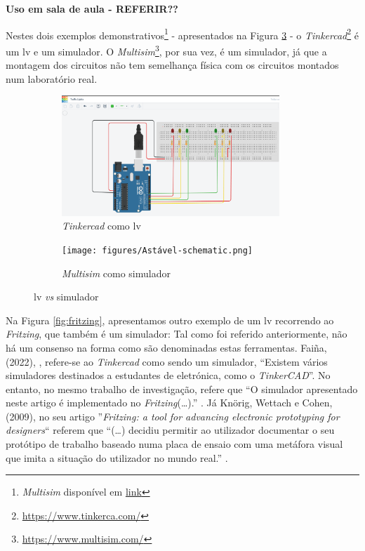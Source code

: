 \textbf{Uso em sala de aula - REFERIR??}

Nestes dois exemplos demonstrativos\footnote{\textit{Multisim} disponível em \href{https://www.ni.com/en/support/downloads/software-products/download.multisim.html\#452133}{link}} - apresentados na Figura \ref{fig:tinkercad} - o \textit{Tinkercad}\footnote{\url{https://www.tinkerca.com/}} é um \acrshort{lv} e um simulador. O \textit{Multisim}\footnote{\url{https://www.multisim.com/}}, por sua vez, é um simulador, já que a montagem dos circuitos não tem semelhança física com os circuitos montados num laboratório real.

\begin{figure}[hbtp]
    \centering
    \begin{subfigure}[hbtp]{0.48\textwidth}
        \centering
        \includegraphics[width=0.9\textwidth]{figures/tinkercad_exemplo.png}
        \caption{\textit{Tinkercad} como \acrshort{lv}}
        \label{fig:tinkercadVL}
    \end{subfigure}
    \begin{subfigure}[hbtp]{0.48\textwidth}
        \texttt{[image: figures/Astável-schematic.png]}
        \caption{\textit{Multisim} como simulador}
        \label{fig:tinkercadOS}
    \end{subfigure}
    \caption{\acrshort{lv} \textit{vs} simulador}
    \label{fig:tinkercad}
\end{figure}

Na Figura \ref{fig:fritzing}, apresentamos outro exemplo de um \acrshort{lv} recorrendo ao \textit{Fritzing}, que também é um simulador: Tal como foi referido anteriormente, não há um consenso na forma como são denominadas estas ferramentas. Faiña, (2022), \cite{faina}, refere-se ao \textit{Tinkercad} como sendo um simulador, ``Existem vários simuladores destinados a estudantes de eletrónica, como o \textit{TinkerCAD}''. No entanto, no mesmo trabalho de investigação, refere que ``O simulador apresentado neste artigo é implementado no \textit{Fritzing}(\ldots).'' \cite{faina}. Já Knörig, Wettach e Cohen, (2009), no seu artigo ''\textit{Fritzing: a tool for advancing electronic prototyping for designers}`` referem que ``(\ldots) decidiu permitir ao utilizador documentar o seu protótipo de trabalho baseado numa placa de ensaio com uma metáfora visual que imita a situação do utilizador no mundo real.'' \cite{Knorig2009Feb}.

